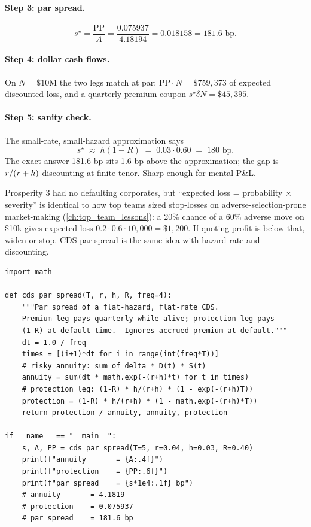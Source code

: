 \paragraph{Step 3: par spread.}
\[
  s^\star
  = \frac{\mathrm{PP}}{A}
  = \frac{0.075937}{4.18194}
  = 0.018158
  = 181.6 \text{ bp}.
\]

\paragraph{Step 4: dollar cash flows.}
On $N = \$10$M the two legs match at par: $\mathrm{PP} \cdot N =
\$759{,}373$ of expected discounted loss, and a quarterly premium
coupon $s^\star \delta N = \$45{,}395$.

\paragraph{Step 5: sanity check.}  The small-rate, small-hazard
approximation says
\[
  s^\star
  \;\approx\; h (1 - R)
  \;=\; 0.03 \cdot 0.60
  \;=\; 180 \text{ bp}.
\]
The exact answer 181.6 bp sits 1.6 bp above the approximation; the
gap is $r/(r+h)$ discounting at finite tenor.  Sharp enough
for mental P\&L.

\begin{prosperitybox}
Prosperity 3 had no defaulting corporates, but ``expected loss =
probability $\times$ severity'' is identical to how top teams sized
stop-losses on adverse-selection-prone market-making
(\cref{ch:top_team_lessons}): a 20\% chance of a 60\% adverse move
on \$10k gives expected loss $0.2 \cdot 0.6 \cdot 10{,}000 =
\$1{,}200$.  If quoting profit is below that, widen or stop.  CDS
par spread is the same idea with hazard rate and discounting.
\end{prosperitybox}

\lstset{style=pythonstyle}
\begin{lstlisting}[caption={Minimal CDS pricer. Reproduces every
number in \cref{sec:cds_worked}.},label=lst:cds_pricer]
import math

def cds_par_spread(T, r, h, R, freq=4):
    """Par spread of a flat-hazard, flat-rate CDS.
    Premium leg pays quarterly while alive; protection leg pays
    (1-R) at default time.  Ignores accrued premium at default."""
    dt = 1.0 / freq
    times = [(i+1)*dt for i in range(int(freq*T))]
    # risky annuity: sum of delta * D(t) * S(t)
    annuity = sum(dt * math.exp(-(r+h)*t) for t in times)
    # protection leg: (1-R) * h/(r+h) * (1 - exp(-(r+h)T))
    protection = (1-R) * h/(r+h) * (1 - math.exp(-(r+h)*T))
    return protection / annuity, annuity, protection

if __name__ == "__main__":
    s, A, PP = cds_par_spread(T=5, r=0.04, h=0.03, R=0.40)
    print(f"annuity       = {A:.4f}")
    print(f"protection    = {PP:.6f}")
    print(f"par spread    = {s*1e4:.1f} bp")
    # annuity       = 4.1819
    # protection    = 0.075937
    # par spread    = 181.6 bp
\end{lstlisting}

